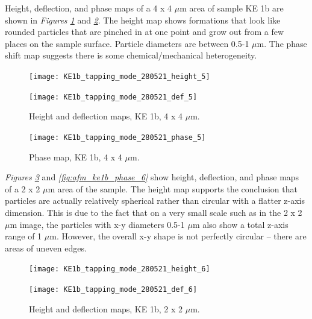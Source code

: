 Height, deflection, and phase maps of a 4 x 4 $\mu$m area of sample KE 1b are shown in \textit{Figures \ref{fig:afm_ke1b_height_def_4}} and \textit{\ref{fig:afm_ke1b_phase_4}}. The height map shows formations that look like rounded particles that are pinched in at one point and grow out from a few places on the sample surface. Particle diameters are between 0.5-1 $\mu$m. The phase shift map suggests there is some chemical/mechanical heterogeneity.

\begin{figure}[H]
\centering
\begin{minipage}{.45\textwidth}
  \centering
  \texttt{[image: KE1b\_tapping\_mode\_280521\_height\_5]}
\end{minipage}
\begin{minipage}{.45\textwidth}
  \centering
  \texttt{[image: KE1b\_tapping\_mode\_280521\_def\_5]}
\end{minipage}
\caption[Height and deflection maps, KE 1b]{Height and deflection maps, KE 1b, 4 x 4 $\mu$m.}
\label{fig:afm_ke1b_height_def_4}
\end{figure}

\begin{figure}[H]
\centering
  \texttt{[image: KE1b\_tapping\_mode\_280521\_phase\_5]}
\caption[Phase map, KE 1b]{Phase map, KE 1b, 4 x 4 $\mu$m.}
\label{fig:afm_ke1b_phase_4}
\end{figure}

\textit{Figures \ref{fig:afm_ke1b_height_def_6}} and \textit{\ref{fig:afm_ke1b_phase_6}} show height, deflection, and phase maps of a 2 x 2 $\mu$m area of the sample. The height map supports the conclusion that particles are actually relatively spherical rather than circular with a flatter z-axis dimension. This is due to the fact that on a very small scale such as in the 2 x 2 $\mu$m image, the particles with x-y diameters 0.5-1 $\mu$m also show a total z-axis range of 1 $\mu$m. However, the overall x-y shape is not perfectly circular – there are areas of uneven edges. 

\begin{figure}[H]
\centering
\begin{minipage}{.45\textwidth}
  \centering
  \texttt{[image: KE1b\_tapping\_mode\_280521\_height\_6]}
\end{minipage}
\begin{minipage}{.45\textwidth}
  \centering
  \texttt{[image: KE1b\_tapping\_mode\_280521\_def\_6]}
\end{minipage}
\caption[Height and deflection maps, KE 1b]{Height and deflection maps, KE 1b, 2 x 2 $\mu$m.}
\label{fig:afm_ke1b_height_def_6}
\end{figure}


